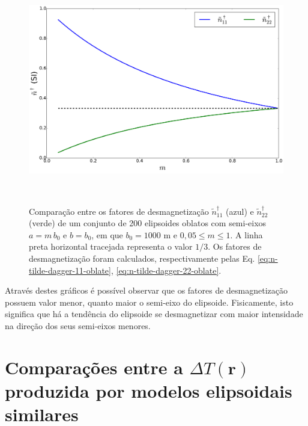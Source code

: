 \begin{figure}[hbt!]
	\centering \includegraphics[width=15cm,height=10cm]{figures/test_n_oblate}
	\caption[Comparação entre os fatores de desmagnetização $\tilde{n}^{\dagger}_{11}$ (azul) e $\tilde{n}^{\dagger}_{22}$ (verde) de um conjunto de 200 elipsoides oblatos com semi-eixos $a=m\, b_0$ e $b=b_0$, em que $b_0=1000$ m e $0,05 \le m \le 1$. A linha preta horizontal tracejada representa o valor $1/3$. Os fatores de desmagnetização foram calculados, respectivamente pelas Eq. \ref{eq:n-tilde-dagger-11-oblate}, \ref{eq:n-tilde-dagger-22-oblate}.]{Comparação entre os fatores de desmagnetização $\tilde{n}^{\dagger}_{11}$ (azul) e $\tilde{n}^{\dagger}_{22}$ (verde) de um conjunto de 200 elipsoides oblatos com semi-eixos $a=m\, b_0$ e $b=b_0$, em que $b_0=1000$ m e $0,05 \le m \le 1$. A linha preta horizontal tracejada representa o valor $1/3$. Os fatores de desmagnetização foram calculados, respectivamente pelas Eq. \ref{eq:n-tilde-dagger-11-oblate}, \ref{eq:n-tilde-dagger-22-oblate}.}
	\label{fig:n_oblato}
\end{figure}

Através destes gráficos é possível observar que os fatores de desmagnetização possuem valor menor, quanto maior o semi-eixo do elipsoide. Fisicamente, isto significa que há a tendência do elipsoide se desmagnetizar com maior intensidade na direção dos seus semi-eixos menores.
\newpage

\section{Comparações entre a $\Delta T (\mathbf{r})$ produzida por modelos elipsoidais similares}

